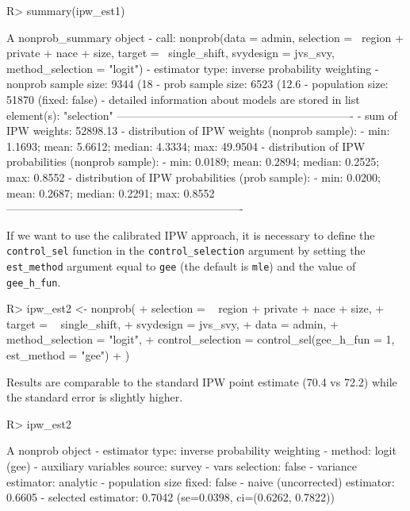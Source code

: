 \documentclass[
]{jss}
\begin{document}
\begin{CodeChunk}
\begin{CodeInput}
R> summary(ipw_est1)
\end{CodeInput}
\begin{CodeOutput}
A nonprob_summary object
 - call: nonprob(data = admin, selection = ~region + private + nace + 
    size, target = ~single_shift, svydesign = jvs_svy, method_selection = "logit")
 - estimator type: inverse probability weighting
 - nonprob sample size: 9344 (18%
 - prob sample size: 6523 (12.6%
 - population size: 51870 (fixed: false)
 - detailed information about models are stored in list element(s): "selection"
----------------------------------------------------------------
 - sum of IPW weights: 52898.13 
 - distribution of IPW weights (nonprob sample):
   - min: 1.1693; mean: 5.6612; median: 4.3334; max: 49.9504
 - distribution of IPW probabilities (nonprob sample):
   - min: 0.0189; mean: 0.2894; median: 0.2525; max: 0.8552
 - distribution of IPW probabilities (prob sample):
   - min: 0.0200; mean: 0.2687; median: 0.2291; max: 0.8552
----------------------------------------------------------------
\end{CodeOutput}
\end{CodeChunk}

If we want to use the calibrated IPW approach, it is necessary to define
the \texttt{control\_sel} function in the \texttt{control\_selection}
argument by setting the \texttt{est\_method} argument equal to
\texttt{gee} (the default is \texttt{mle}) and the value of
\texttt{gee\_h\_fun}.

\begin{CodeChunk}
\begin{CodeInput}
R> ipw_est2 <- nonprob(
+   selection = ~ region + private + nace + size,
+   target = ~ single_shift,
+   svydesign = jvs_svy,
+   data = admin,
+   method_selection = "logit",
+   control_selection = control_sel(gee_h_fun = 1, est_method = "gee")
+ )
\end{CodeInput}
\end{CodeChunk}

Results are comparable to the standard IPW point estimate (70.4 vs 72.2)
while the standard error is slightly higher.

\begin{CodeChunk}
\begin{CodeInput}
R> ipw_est2
\end{CodeInput}
\begin{CodeOutput}
A nonprob object
 - estimator type: inverse probability weighting
 - method: logit (gee)
 - auxiliary variables source: survey
 - vars selection: false
 - variance estimator: analytic
 - population size fixed: false
 - naive (uncorrected) estimator: 0.6605
 - selected estimator: 0.7042 (se=0.0398, ci=(0.6262, 0.7822))
\end{CodeOutput}
\end{CodeChunk}
\end{document}
